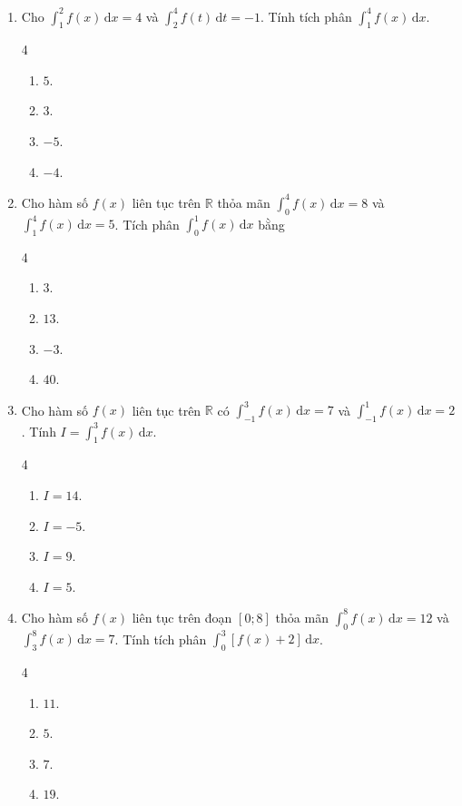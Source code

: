 \documentclass[12pt]{article}
\begin{document}
\begin{enumerate}[label=\textbf{Câu \arabic*.}]
		\item Cho $\displaystyle \int_1^2 f(x)\,\mathrm{d}x = 4$ và $\displaystyle \int_2^4 f(t)\,\mathrm{d}t = -1$. Tính tích phân $\displaystyle \int_1^4 f(x)\,\mathrm{d}x$.
		\begin{multicols}{4}
			\begin{enumerate}[label=\textbf{\Alph*.}]
				\item $5$.
				\item $3$.
				\item $-5$.
				\item $-4$.
			\end{enumerate}
		\end{multicols}
		
		\item Cho hàm số $f(x)$ liên tục trên $\mathbb{R}$ thỏa mãn $\displaystyle \int_0^4 f(x)\,\mathrm{d}x = 8$ và $\displaystyle \int_1^4 f(x)\,\mathrm{d}x = 5$. Tích phân $\displaystyle \int_0^1 f(x)\,\mathrm{d}x$ bằng
		\begin{multicols}{4}
			\begin{enumerate}[label=\textbf{\Alph*.}]
				\item $3$.
				\item $13$.
				\item $-3$.
				\item $40$.
			\end{enumerate}
		\end{multicols}
		
		\item Cho hàm số $f(x)$ liên tục trên $\mathbb{R}$ có $\displaystyle \int_{-1}^3 f(x)\,\mathrm{d}x = 7$ và $\displaystyle \int_{-1}^1 f(x)\,\mathrm{d}x = 2$. Tính $I = \displaystyle \int_1^3 f(x)\,\mathrm{d}x$.
		\begin{multicols}{4}
			\begin{enumerate}[label=\textbf{\Alph*.}]
				\item $I = 14$.
				\item $I = -5$.
				\item $I = 9$.
				\item $I = 5$.
			\end{enumerate}
		\end{multicols}
		
		\item Cho hàm số $f(x)$ liên tục trên đoạn $[0; 8]$ thỏa mãn $\displaystyle \int_0^8 f(x)\,\mathrm{d}x = 12$ và $\displaystyle \int_3^8 f(x)\,\mathrm{d}x = 7$. Tính tích phân $\displaystyle \int_0^3 [f(x) + 2]\,\mathrm{d}x$.
		\begin{multicols}{4}
			\begin{enumerate}[label=\textbf{\Alph*.}]
				\item $11$.
				\item $5$.
				\item $7$.
				\item $19$.
			\end{enumerate}
		\end{multicols}
		

\end{enumerate}
\end{document}

